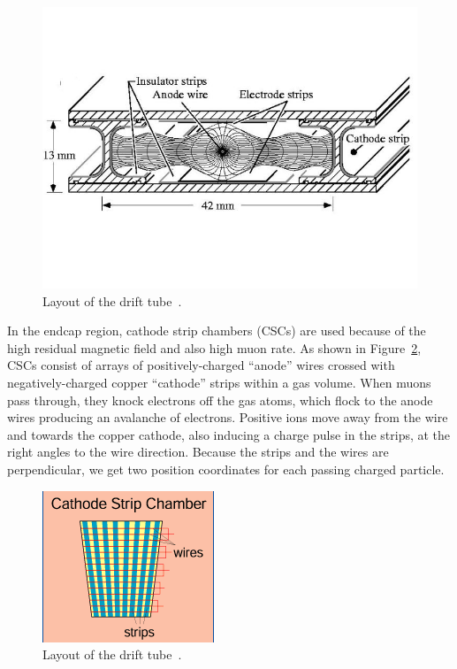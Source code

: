\begin{figure}[!htbp]
\centering
\includegraphics[width=.9\textwidth]{figures/DriftTubeDetails.jpg}
\caption{Layout of the drift tube~\cite{web:DT}.}
\label{fig:DT}
\end{figure} 
 
In the endcap region,  cathode strip chambers (CSCs) are used because of the high residual magnetic field and also high muon rate. As shown in Figure~\ref{fig:CSC}, 
CSCs consist of arrays of positively-charged ``anode'' wires crossed with negatively-charged copper ``cathode'' strips within a gas volume. When muons pass through, they knock electrons off the gas atoms, which flock to the anode wires producing an avalanche of electrons. Positive ions move away from the wire and towards the copper cathode, also inducing a charge pulse in the strips, at 
the right angles to the wire direction.
Because the strips and the wires are perpendicular, we get two position coordinates for each passing charged particle.

\begin{figure}[!htbp]
\centering
\includegraphics[width=.9\textwidth]{figures/CSC.png}
\caption{Layout of the drift tube~\cite{web:CSC}.}
\label{fig:CSC}
\end{figure} 


